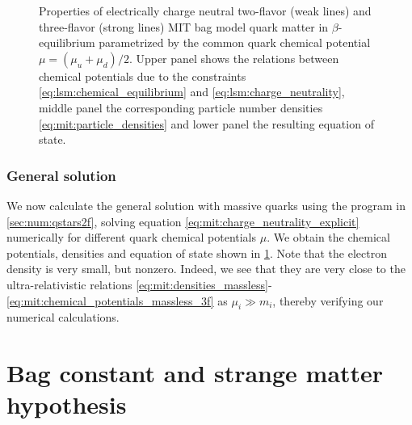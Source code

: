 \begin{figure}
\caption{\label{fig:mit:eos}%
Properties of electrically charge neutral two-flavor (weak lines) and three-flavor (strong lines) MIT bag model quark matter in $\beta$-equilibrium parametrized by the common quark chemical potential $\mu = (\mu_u+\mu_d)/2$.
Upper panel  shows the relations between chemical potentials due to the constraints \eqref{eq:lsm:chemical_equilibrium} and \eqref{eq:lsm:charge_neutrality},
middle panel  the corresponding particle number densities \eqref{eq:mit:particle_densities} and
lower panel  the resulting equation of state.
}
\end{figure}

\subsubsection{General solution}

We now calculate the general solution with massive quarks using the program in \cref{sec:num:qstars2f},
solving equation \eqref{eq:mit:charge_neutrality_explicit} numerically for different quark chemical potentials $\mu$.
We obtain the chemical potentials, densities and equation of state shown in \cref{fig:mit:eos}.
Note that the electron density is very small, but nonzero.
Indeed, we see that they are very close to the ultra-relativistic relations
\eqref{eq:mit:densities_massless}-\eqref{eq:mit:chemical_potentials_massless_3f}
as $\mu_i \gg m_i$, thereby verifying our numerical calculations.


\section{Bag constant and strange matter hypothesis}

